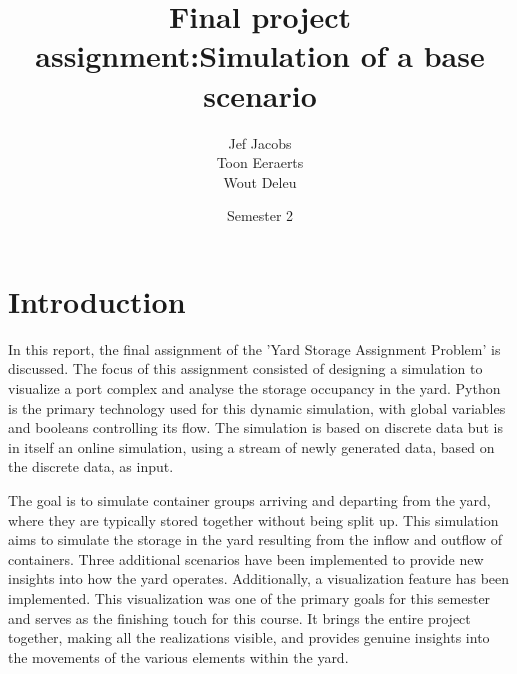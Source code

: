 \documentclass{article}
\title{Final project assignment:\@ Simulation of a base scenario }
\author{Jef Jacobs \\ Toon Eeraerts \\ Wout Deleu}
\date{Semester 2}
\begin{document}
\setlength{\parindent}{0pt} \maketitle \tableofcontents \newpage %

\maketitle
\newpage

\section{Introduction}
In this report, the final assignment of the 'Yard Storage Assignment Problem'
is discussed. The focus of this assignment consisted of designing a simulation
to visualize a port complex and analyse the storage occupancy in the yard.
Python is the primary technology used for this dynamic simulation, with global
variables and booleans controlling its flow. The simulation is based on
discrete data but is in itself an online simulation, using a stream of newly
generated data, based on the discrete data, as input.

The goal is to simulate container groups arriving and departing from the yard,
where they are typically stored together without being split up. This
simulation aims to simulate the storage in the yard resulting from the inflow
and outflow of containers. Three additional scenarios have been implemented to
provide new insights into how the yard operates. Additionally, a visualization
feature has been implemented. This visualization was one of the primary goals
for this semester and serves as the finishing touch for this course. It brings
the entire project together, making all the realizations visible, and provides
genuine insights into the movements of the various elements within the yard.

\end{document}
